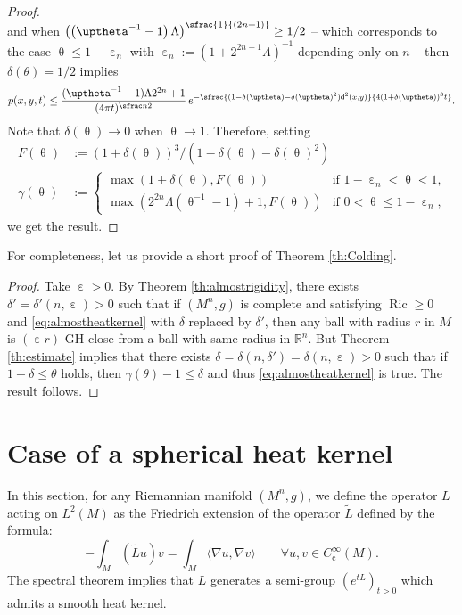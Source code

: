 \documentclass[10pt]{amsart}
\newcommand{\spfrac}[2]{\sfrac{#1}{(#2)}}
\newcommand{\rmc}{\mathrm{c}}
\theoremstyle{plain}
\theoremstyle{definition}
\newcommand{\setR}{\mathbb{R}}
\let\eps\upepsilon
\newcommand{\dist}{\mathsf{d}}
\DeclareMathOperator{\Ric}{Ric}
\begin{document}
\begin{proof}
\begin{equation}
\end{equation}
and when $\left(\left(\uptheta^{-1}-1\right)\Lambda\right)^{\spfrac{1}{2n+1}} \ge 1/2$ -- which corresponds to the case $\uptheta \le 1-\eps_n$ with $\eps_n:=(1+2^{2n+1}\Lambda)^{-1}$ depending only on $n$ -- then $\delta(\theta)=1/2$ implies
\begin{equation}\label{eq:end2}
p(x,y,t)\le \frac{(\uptheta^{-1} - 1)\Lambda 2^{2n} + 1}{(4\pi t)^{\sfrac n2}}\,e^{-\sfrac{(1-\delta(\uptheta)-\delta(\uptheta)^2)\dist^2(x,y)}{4(1+\delta(\uptheta))^3t}}.\end{equation}
Note that $\delta(\uptheta) \to 0$ when $\uptheta \to 1$. Therefore, setting
\begin{align*}
F(\uptheta)&:=(1+\delta(\uptheta))^3/(1-\delta(\uptheta)-\delta(\uptheta)^2)\\
\tag*{and}
\gamma(\uptheta)&:=
\begin{cases}
\max(1+\delta(\uptheta),F(\uptheta)) & \text{if $1-\eps_n<\uptheta<1$,}\\
\max(2^{2n}\Lambda (\uptheta^{-1} - 1)+1,F(\uptheta)) & \text{if $0<\uptheta \le 1-\eps_n$,}
\end{cases}
\end{align*}
we get the result.
\end{proof}

For completeness, let us provide a short proof of Theorem \ref{th:Colding}.

\begin{proof}
Take $\upepsilon>0$. By Theorem \ref{th:almostrigidity}, there exists $\delta'=\delta'(n,\upepsilon)>0$ such that if $(M^n,g)$ is complete and satisfying $\Ric \ge 0$ and \eqref{eq:almostheatkernel} with $\delta$ replaced by $\delta'$, then any ball with radius $r$ in $M$ is $(\upepsilon r)$-GH close from a ball with same radius in $\setR^n$. But Theorem \ref{th:estimate} implies that there exists $\delta=\delta(n,\delta')=\delta(n,\upepsilon)>0$ such that if $1-\delta\le \theta$ holds, then $\gamma(\theta)-1 \le \delta$ and thus \eqref{eq:almostheatkernel} is true. The result follows.
\end{proof}

\section{Case of a spherical heat kernel}\label{sec:7}

In this section, for any Riemannian manifold $(M^n,g)$, we define the operator $L$ acting on $L^2(M)$ as the Friedrich extension of the operator $\tilde{L}$ defined by the formula:\vspace*{-3pt}
\[
- \int_M (\tilde{L}u)v = \int_M \langle \nabla u, \nabla v \rangle \qquad \forall u,v \in C^\infty_\rmc(M).
\]
The spectral theorem implies that $L$ generates a semi-group $(e^{tL})_{t>0}$ which admits a smooth heat kernel.
\end{document}
